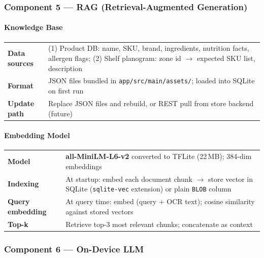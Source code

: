 \documentclass[11pt,a4paper]{article}
\begin{document}
\subsubsection{Component 5 — RAG (Retrieval-Augmented Generation)}

\paragraph{Knowledge Base}

\begin{table}[h!]
\renewcommand{\arraystretch}{1.3}
\begin{tabularx}{\textwidth}{L{3cm} X}
\toprule
\textbf{Data sources} & (1) Product DB: name, SKU, brand, ingredients, nutrition facts, allergen flags; (2) Shelf planogram: zone id $\rightarrow$ expected SKU list, description \\
\textbf{Format} & JSON files bundled in \texttt{app/src/main/assets/}; loaded into SQLite on first run \\
\textbf{Update path} & Replace JSON files and rebuild, or REST pull from store backend (future) \\
\bottomrule
\end{tabularx}
\end{table}

\paragraph{Embedding Model}

\begin{table}[h!]
\renewcommand{\arraystretch}{1.3}
\begin{tabularx}{\textwidth}{L{3cm} X}
\toprule
\textbf{Model} & \textbf{all-MiniLM-L6-v2} converted to TFLite (22\,MB); 384-dim embeddings \\
\textbf{Indexing} & At startup: embed each document chunk $\rightarrow$ store vector in SQLite (\texttt{sqlite-vec} extension) or plain \texttt{BLOB} column \\
\textbf{Query embedding} & At query time: embed (query + OCR text); cosine similarity against stored vectors \\
\textbf{Top-k} & Retrieve top-3 most relevant chunks; concatenate as context \\
\bottomrule
\end{tabularx}
\end{table}

\subsubsection{Component 6 — On-Device LLM}
\end{document}
